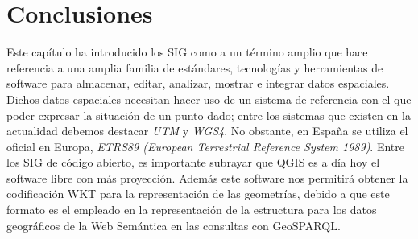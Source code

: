 


\section{Conclusiones}

Este capítulo ha introducido los SIG como a un término amplio que hace referencia a una amplia familia de estándares, tecnologías y herramientas de software para almacenar, editar, analizar, mostrar e integrar datos espaciales. Dichos datos espaciales necesitan hacer uso de un sistema de referencia con el que poder expresar la situación de un punto dado; entre los sistemas que existen en la actualidad debemos destacar \textit{UTM} y \textit{WGS4}. No obstante, en España se utiliza el oficial en Europa, \textit{ETRS89 (European Terrestrial Reference System 1989)}. Entre los SIG de código abierto, es importante subrayar que QGIS es a día hoy el software libre con más proyección. Además este software nos permitirá obtener la codificación WKT para la representación de las geometrías, debido a que este formato es el empleado en la representación de la estructura para los datos geográficos de la Web Semántica en las consultas con GeoSPARQL.

